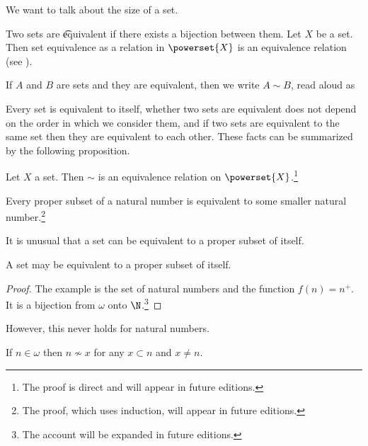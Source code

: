 

We want to talk about the size of a set.


Two sets are \t{equivalent} if there exists a bijection between them.
Let $X$ be a set.
Then set equivalence as a relation in $\powerset{X}$ is an equivalence relation (see ).


If $A$ and $B$ are sets and they are equivalent, then we write $A \sim B$, read aloud as 


Every set is equivalent to itself, whether two sets are equivalent does not depend on the order in which we consider them, and if two sets are equivalent to the same set then they are equivalent to each other.
These facts can be summarized by the following proposition.

\begin{proposition}
	Let $X$ a set. Then $\sim$ is an equivalence relation on $\powerset{X}$.\footnote{The proof is direct and will appear in future editions.}
\end{proposition}


\begin{proposition}
	Every proper subset of a natural number is equivalent to some smaller natural number.\footnote{The proof, which uses induction, will appear in future editions.}
\end{proposition}


It is unusual that a set can be equivalent to a proper subset of itself.

\begin{proposition}
	A set may be equivalent to a proper subset of itself.
\end{proposition}
\begin{proof}
The example is the set of natural numbers and the function $f(n) = n^+$.
It is a bijection from $\omega$ onto $\N$.\footnote{The account will be expanded in future editions.}
\end{proof}
However, this never holds for natural numbers.
\begin{proposition}
	If $n \in \omega$ then $n \not\sim x$ for any $x \subset n$ and $x \neq n$.
\end{proposition}

